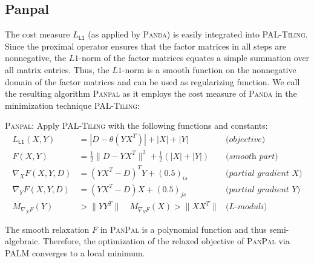 \subsection{Panpal}\label{sec:PR:panpal}
The cost measure $L_{\mathsf{L1}}$ (as applied by \textsc{Panda}) is easily  integrated into \textsc{PAL-Tiling}. Since the proximal operator ensures that the factor matrices in all steps are nonnegative, the $L1$-norm of the factor matrices equates a simple summation over all matrix entries. Thus, the $L1$-norm is a smooth function on the nonnegative domain of the factor matrices and can be used as regularizing function. We call the resulting algorithm \textsc{Panpal} as it employs the cost measure of \textsc{Panda} in the minimization technique \textsc{PAL-Tiling}:
\begin{mybox}
\textsc{Panpal}: Apply \textsc{PAL-Tiling} with the following functions and constants:
\begin{align*}
    L_{\mathsf{L1}}(X,Y) &= |D-\theta(YX^T)|+|X|+|Y| & \textit{(objective)}\\
    F(X,Y)&=\frac{1}{2}\|D-YX^T\|^2+ \frac{1}{2}(|X|+|Y|) & \textit{(smooth part)}\\
    \nabla_XF(X,Y,D)&=(YX^T-D)^TY+(0.5)_{is}& \textit{(partial gradient X)}\\
\nabla_YF(X,Y,D)&=(YX^T-D)X+(0.5)_{js} & \textit{(partial gradient Y)}\\
M_{\nabla_XF}(Y)&>\|YY^T\| \quad M_{\nabla_YF}(X)>\|XX^T\| & \textit{(L-moduli)}
\end{align*}
\end{mybox}
The smooth relaxation $F$ in \textsc{PanPal} is a polynomial function and thus semi-algebraic. Therefore, the optimization of the relaxed objective of \textsc{PanPal} via PALM converges to a local minimum.
